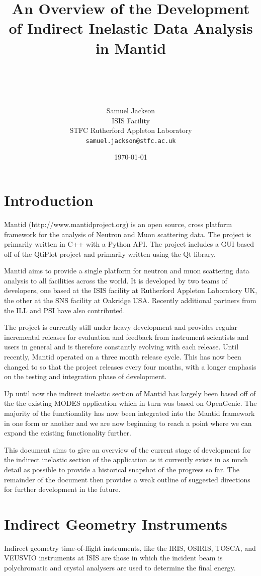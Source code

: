\documentclass[paper=a4, fontsize=11pt]{scrartcl}	%
\title{ \vspace{-1in} 	\usefont{OT1}{bch}{b}{n}
		\huge \strut An Overview of the Development of Indirect Inelastic Data Analysis in Mantid\strut \\
}
\author{ 									\usefont{OT1}{bch}{m}{n}
        Samuel Jackson\\		\usefont{OT1}{bch}{m}{n}
		ISIS Facility\\	\usefont{OT1}{bch}{m}{n}
        STFC Rutherford Appleton Laboratory\\
        \texttt{samuel.jackson@stfc.ac.uk}
}
\date{\today}
\numberwithin{equation}{section}															%
\numberwithin{figure}{section}																%
\numberwithin{table}{section}																%
\begin{document}
\maketitle
\clearpage
\tableofcontents
\section{Introduction}
Mantid (http://www.mantidproject.org) is an open source, cross platform framework for the analysis of Neutron and Muon scattering data. The project is primarily written in C++ with a Python API. The project includes a GUI based off of the QtiPlot project and primarily written using the Qt library.

Mantid aims to provide a single platform for neutron and muon scattering data analysis to all facilities across the world. It is developed by two teams of developers, one based at the ISIS facility at Rutherford Appleton Laboratory UK, the other at the SNS facility at Oakridge USA. Recently additional partners from the ILL and PSI have also contributed.

The project is currently still under heavy development and provides regular incremental releases for evaluation and feedback from instrument scientists and users in general and is therefore constantly evolving with each release. Until recently, Mantid operated on a three month release cycle. This has now been changed to so that the project releases every four months, with a longer emphasis on the testing and integration phase of development.

Up until now the indirect inelastic section of Mantid has largely been based off of the the existing MODES application which in turn was based on OpenGenie\cite{wshowells2010}. The majority of the functionality has now been integrated into the Mantid framework in one form or another and we are now beginning to reach a point where we can expand the existing functionality further.

This document aims to give an overview of the current stage of development for the indirect inelastic section of the application as it currently exists in as much detail as possible to provide a historical snapshot of the progress so far. The remainder of the document then provides a weak outline of suggested directions for further development in the future.


\section{Indirect Geometry Instruments}
Indirect geometry time-of-flight instruments, like the IRIS, OSIRIS, TOSCA, and VEUSVIO instruments at ISIS are those in which the incident beam is polychromatic and crystal analysers are used to determine the final energy.
\end{document}
